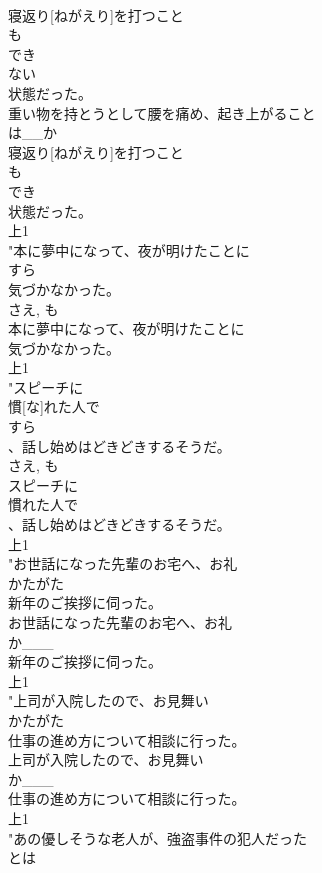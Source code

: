 \documentclass[8pt]{extreport}
\begin{document}
\begin{CJK}{UTF8}{min}
\\	寝返り[ねがえり]を打つこと
\\	も
\\	でき
\\	ない
\\	状態だった。
\\	重い物を持とうとして腰を痛め、起き上がること
\\	は__か
\\	寝返り[ねがえり]を打つこと
\\	も
\\	でき
\\	状態だった。
\\	上1
\\	"本に夢中になって、夜が明けたことに
\\	すら
\\	気づかなかった。
\\	さえ, も	
\\	本に夢中になって、夜が明けたことに
\\	気づかなかった。
\\	上1
\\	"スピーチに
\\	慣[な]れた人で
\\	すら
\\	、話し始めはどきどきするそうだ。
\\	さえ, も	
\\	スピーチに
\\	慣れた人で
\\	、話し始めはどきどきするそうだ。
\\	上1
\\	"お世話になった先輩のお宅へ、お礼
\\	かたがた
\\	新年のご挨拶に伺った。
\\	お世話になった先輩のお宅へ、お礼
\\	か___
\\	新年のご挨拶に伺った。
\\	上1
\\	"上司が入院したので、お見舞い
\\	かたがた
\\	仕事の進め方について相談に行った。
\\	上司が入院したので、お見舞い
\\	か___
\\	仕事の進め方について相談に行った。
\\	上1
\\	"あの優しそうな老人が、強盗事件の犯人だった
\\	とは

\end{CJK}
\end{document}
